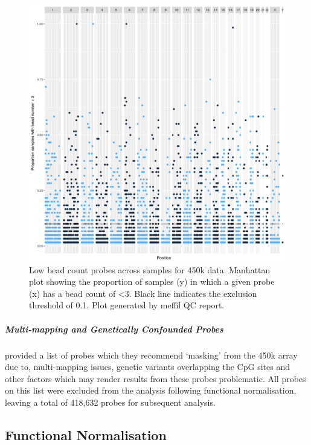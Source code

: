 \documentclass[]{book}
\let\oldsubparagraph\subparagraph
\renewcommand{\subparagraph}[1]{\oldsubparagraph{#1}\mbox{}}
\begin{document}
\begin{figure}

{\centering \includegraphics[width=0.8\linewidth]{figs/MAVIDOSqc450kbeadNumAcross} 

}

\caption{Low bead count probes across samples for 450k data. Manhattan plot showing the proportion of samples (y) in which a given probe (x) has a bead count of \textless3. Black line indicates the exclusion threshold of 0.1. Plot generated by meffil QC report.}\label{fig:MAVIDOSqc450kbeadNumAcross}
\end{figure}



\hypertarget{multi-mapping-and-genetically-confounded-probes-1}{%
\subparagraph{Multi-mapping and Genetically Confounded Probes}\label{multi-mapping-and-genetically-confounded-probes-1}}

\citet{Zhou2017} provided a list of probes which they recommend `masking' from the 450k array due to, multi-mapping issues, genetic variants overlapping the CpG sites and other factors which may render results from these probes problematic. All probes on this list were excluded from the analysis following functional normalisation, leaving a total of 418,632 probes for subsequent analysis.

\hypertarget{functional-normalisation}{%
\subsection{Functional Normalisation}\label{functional-normalisation}}
\end{document}
